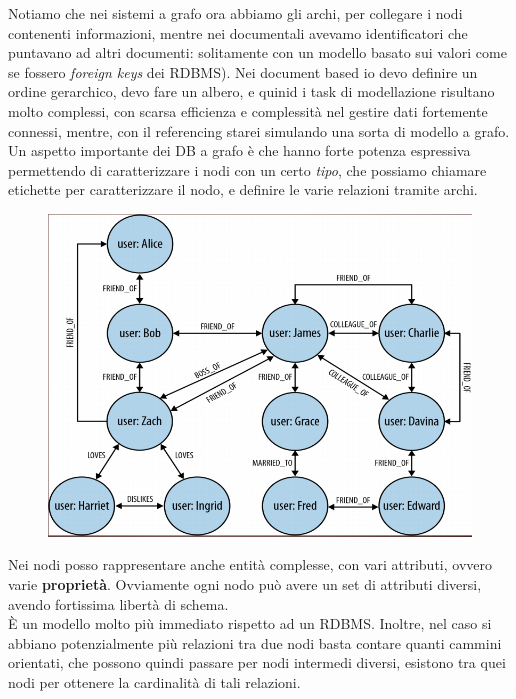 Notiamo che nei sistemi a grafo ora abbiamo gli archi, per collegare i nodi contenenti informazioni, mentre nei documentali avevamo identificatori che puntavano ad altri documenti: solitamente con un modello basato sui valori come se fossero \textit{foreign keys} dei RDBMS). Nei document based io devo definire un ordine gerarchico, devo fare un albero, e quinid i task di modellazione risultano molto complessi, con scarsa efficienza e complessità nel gestire dati fortemente connessi, mentre, con il referencing starei simulando una sorta di modello a grafo. \\

Un aspetto importante dei DB a grafo è che hanno forte potenza espressiva permettendo di caratterizzare i nodi con un certo \textit{tipo}, che possiamo chiamare etichette per caratterizzare il nodo, e definire le varie relazioni tramite archi.
\begin{figure}[H]
    \centering
    \includegraphics[scale = 0.4]{Immagini/slide-14-graphdb.PNG}
\end{figure}
Nei nodi posso rappresentare anche entità complesse, con vari attributi, ovvero varie \textbf{proprietà}. Ovviamente ogni nodo può avere un set di attributi diversi, avendo fortissima libertà di schema.\\
È un modello molto più immediato rispetto ad un RDBMS. Inoltre, nel caso si abbiano potenzialmente più relazioni tra due nodi basta contare quanti cammini orientati, che possono quindi passare per nodi intermedi diversi, esistono tra quei nodi per ottenere la cardinalità di tali relazioni. \\

